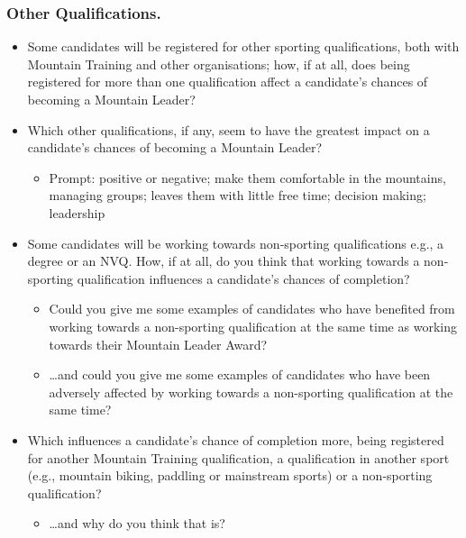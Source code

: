 \documentclass[
  12pt,
  a4paper,
]{book}
\providecommand{\tightlist}{%
  \setlength{\itemsep}{0pt}\setlength{\parskip}{0pt}}
\begin{document}
\hypertarget{other-qualifications.}{%
\subsubsection{Other Qualifications.}\label{other-qualifications.}}

\begin{itemize}
\tightlist
\item
  Some candidates will be registered for other sporting qualifications, both with Mountain Training and other organisations; how, if at all, does being registered for more than one qualification affect a candidate's chances of becoming a Mountain Leader?
\item
  Which other qualifications, if any, seem to have the greatest impact on a candidate's chances of becoming a Mountain Leader?

  \begin{itemize}
  \tightlist
  \item
    Prompt: positive or negative; make them comfortable in the mountains, managing groups; leaves them with little free time; decision making; leadership
  \end{itemize}
\item
  Some candidates will be working towards non-sporting qualifications e.g., a degree or an NVQ. How, if at all, do you think that working towards a non-sporting qualification influences a candidate's chances of completion?

  \begin{itemize}
  \tightlist
  \item
    Could you give me some examples of candidates who have benefited from working towards a non-sporting qualification at the same time as working towards their Mountain Leader Award?
  \item
    \ldots and could you give me some examples of candidates who have been adversely affected by working towards a non-sporting qualification at the same time?
  \end{itemize}
\item
  Which influences a candidate's chance of completion more, being registered for another Mountain Training qualification, a qualification in another sport (e.g., mountain biking, paddling or mainstream sports) or a non-sporting qualification?

  \begin{itemize}
  \tightlist
  \item
    \ldots and why do you think that is?
  \end{itemize}
\end{itemize}
\end{document}

